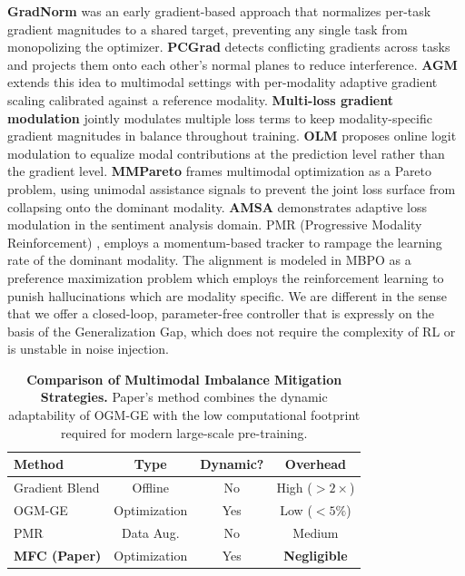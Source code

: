 \documentclass[fleqn,10pt]{wlscirep}
\begin{document}
\textbf{GradNorm} \cite{chen2018gradnorm} was an early gradient-based approach that normalizes per-task gradient magnitudes to a shared target, preventing any single task from monopolizing the optimizer. \textbf{PCGrad} \cite{yu2020gradient} detects conflicting gradients across tasks and projects them onto each other's normal planes to reduce interference. \textbf{AGM} \cite{li2023boosting} extends this idea to multimodal settings with per-modality adaptive gradient scaling calibrated against a reference modality. \textbf{Multi-loss gradient modulation} \cite{kontras2024improving} jointly modulates multiple loss terms to keep modality-specific gradient magnitudes in balance throughout training. \textbf{OLM} \cite{zong2024balancing} proposes online logit modulation to equalize modal contributions at the prediction level rather than the gradient level. \textbf{MMPareto} \cite{wei2024mmpareto} frames multimodal optimization as a Pareto problem, using unimodal assistance signals to prevent the joint loss surface from collapsing onto the dominant modality. \textbf{AMSA} \cite{wang2023amsa} demonstrates adaptive loss modulation in the sentiment analysis domain. PMR (Progressive Modality Reinforcement) \cite{xu2025balancebenchmark}, employs a momentum-based tracker to rampage the learning rate of the dominant modality. The alignment is modeled in MBPO \cite{liu2025modality} as a preference maximization problem which employs the reinforcement learning to punish hallucinations which are modality specific. We are different in the sense that we offer a closed-loop, parameter-free controller that is expressly on the basis of the Generalization Gap, which does not require the complexity of RL or is unstable in noise injection.


\begin{table}[h]
\caption{\textbf{Comparison of Multimodal Imbalance Mitigation Strategies.} Paper's method combines the dynamic adaptability of OGM-GE with the low computational footprint required for modern large-scale pre-training.}
\label{tab:relwork}
\centering
\begin{tabular}{@{}lccc@{}}
\toprule
\textbf{Method} & \textbf{Type} & \textbf{Dynamic?} & \textbf{Overhead} \\ \midrule
Gradient Blend \cite{wang2020makes} & Offline & No & High ($>2\times$) \\
OGM-GE \cite{peng2022balanced} & Optimization & Yes & Low ($<5\%$) \\
PMR \cite{xu2025balancebenchmark} & Data Aug. & No & Medium \\
\textbf{MFC (Paper)} & Optimization & Yes & \textbf{Negligible} \\ \bottomrule
\end{tabular}
\end{table}
\end{document}
